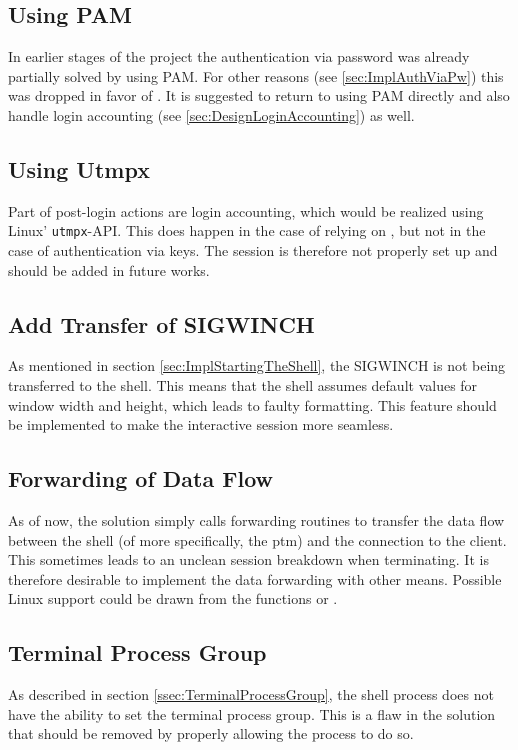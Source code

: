 \documentclass[10pt,a4paper,titlepage,twoside,english,final]{zhawreprt}
\begin{document}
\subsection{Using PAM}\label{ssec:UsingPAM}
In earlier stages of the project the authentication via password was already partially solved by using \gls{PAM}.
For other reasons (see \ref{sec:ImplAuthViaPw}) this was dropped in favor of \cite{login}.
It is suggested to return to using \gls{PAM} directly and also handle \gls{login} accounting (see \ref{sec:DesignLoginAccounting}) as well.

\subsection{Using Utmpx}\label{ssec:UsingUtmpx}
Part of post-\gls{login} actions are \gls{login} accounting, which would be realized using \gls{Linux}' \texttt{utmpx}-\gls{API}.
This does happen in the case of relying on \cite{login}, but not in the case of authentication via keys.
The session is therefore not properly set up and should be added in future works.

\subsection{Add Transfer of SIGWINCH}\label{ssec:AddTransferOfSIGWINCH}
As mentioned in section \ref{sec:ImplStartingTheShell}, the \gls{SIGWINCH} is not being transferred to the \gls{shell}.
This means that the \gls{shell} assumes default values for window width and height, which leads to faulty formatting.
This feature should be implemented to make the interactive session more seamless.

\subsection{Forwarding of Data Flow}\label{ssec:ForwardingOfDataFlow}
As of now, the solution simply calls forwarding routines to transfer the data flow between the \gls{shell} (of more specifically, the \gls{ptm}) and the connection to the client.
This sometimes leads to an unclean session breakdown when terminating.
It is therefore desirable to implement the data forwarding with other means.
Possible \gls{Linux} support could be drawn from the functions \cite{select} or \cite{poll}.

\subsection{Terminal Process Group}\label{ssec:ProspectTerminalProcessGroup}
As described in section \ref{ssec:TerminalProcessGroup}, the \gls{shell} process does not have the ability to set the terminal process group.
This is a flaw in the solution that should be removed by properly allowing the process to do so.
\end{document}
